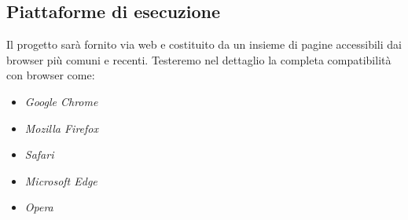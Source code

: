 \subsection{Piattaforme di esecuzione}

Il progetto sarà fornito via web e costituito da un insieme di pagine accessibili dai browser più comuni e recenti. Testeremo nel dettaglio la completa compatibilità con browser come:
\begin{itemize}
\item \textit{Google Chrome}
\item \textit{Mozilla Firefox}
\item \textit{Safari}
\item \textit{Microsoft Edge}
\item \textit{Opera}
\end{itemize}

